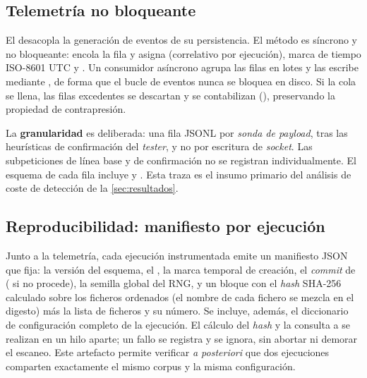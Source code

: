 \subsection{Telemetría no bloqueante}
\label{sec:telemetria}

El  desacopla la generación de eventos de su
persistencia. El método  es síncrono y no bloqueante: encola la
fila y asigna  (correlativo por ejecución), marca de
tiempo ISO-8601 UTC y \rid. Un consumidor asíncrono agrupa las filas en lotes
y las escribe mediante , de forma que el bucle de
eventos nunca se bloquea en disco. Si la cola se llena, las filas excedentes se
descartan y se contabilizan (), preservando la propiedad de
contrapresión.

La \textbf{granularidad} es deliberada: una fila JSONL por \emph{sonda de
payload}, tras las heurísticas de confirmación del \emph{tester}, y no por
escritura de \emph{socket}. Las subpeticiones de línea base y de confirmación
no se registran individualmente. El esquema de cada fila incluye  y . Esta traza
es el insumo primario del análisis de coste de detección de la
\cref{sec:resultados}.

\subsection{Reproducibilidad: manifiesto por ejecución}
\label{sec:manifiesto}

Junto a la telemetría, cada ejecución instrumentada emite un manifiesto JSON
que fija: la versión del esquema, el \rid, la marca temporal de creación, el
\emph{commit} de  ( si no procede), la semilla global
del RNG, y un bloque  con el \emph{hash} SHA-256 calculado sobre
los ficheros  ordenados (el nombre de cada fichero se
mezcla en el digesto) más la lista de ficheros y su número. Se incluye, además,
el diccionario de configuración completo de la ejecución. El cálculo del
\emph{hash} y la consulta a  se realizan en un hilo aparte; un fallo
se registra y se ignora, sin abortar ni demorar el escaneo. Este artefacto
permite verificar \emph{a posteriori} que dos ejecuciones comparten exactamente
el mismo corpus y la misma configuración.

